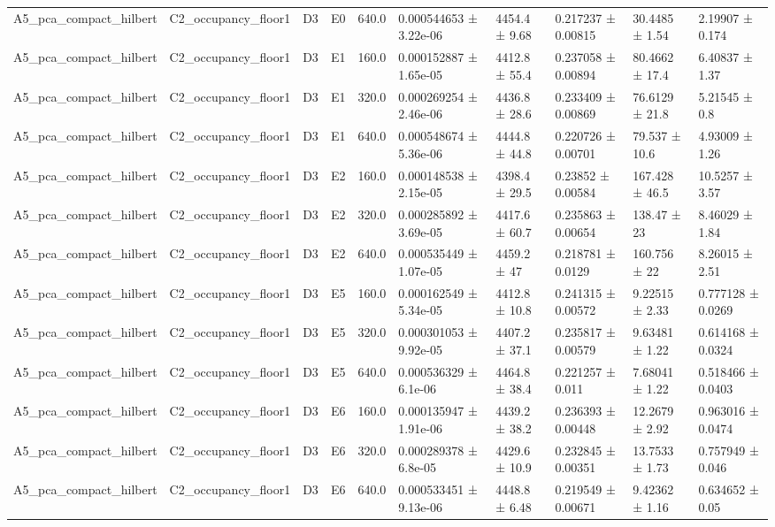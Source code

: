\begin{table}
\begin{tabular}{llllllllll}
A5\_pca\_compact\_hilbert & C2\_occupancy\_floor1 & D3 & E0 & 640.0 & 0.000544653 ± 3.22e-06 & 4454.4 ± 9.68 & 0.217237 ± 0.00815 & 30.4485 ± 1.54 & 2.19907 ± 0.174 \\
A5\_pca\_compact\_hilbert & C2\_occupancy\_floor1 & D3 & E1 & 160.0 & 0.000152887 ± 1.65e-05 & 4412.8 ± 55.4 & 0.237058 ± 0.00894 & 80.4662 ± 17.4 & 6.40837 ± 1.37 \\
A5\_pca\_compact\_hilbert & C2\_occupancy\_floor1 & D3 & E1 & 320.0 & 0.000269254 ± 2.46e-06 & 4436.8 ± 28.6 & 0.233409 ± 0.00869 & 76.6129 ± 21.8 & 5.21545 ± 0.8 \\
A5\_pca\_compact\_hilbert & C2\_occupancy\_floor1 & D3 & E1 & 640.0 & 0.000548674 ± 5.36e-06 & 4444.8 ± 44.8 & 0.220726 ± 0.00701 & 79.537 ± 10.6 & 4.93009 ± 1.26 \\
A5\_pca\_compact\_hilbert & C2\_occupancy\_floor1 & D3 & E2 & 160.0 & 0.000148538 ± 2.15e-05 & 4398.4 ± 29.5 & 0.23852 ± 0.00584 & 167.428 ± 46.5 & 10.5257 ± 3.57 \\
A5\_pca\_compact\_hilbert & C2\_occupancy\_floor1 & D3 & E2 & 320.0 & 0.000285892 ± 3.69e-05 & 4417.6 ± 60.7 & 0.235863 ± 0.00654 & 138.47 ± 23 & 8.46029 ± 1.84 \\
A5\_pca\_compact\_hilbert & C2\_occupancy\_floor1 & D3 & E2 & 640.0 & 0.000535449 ± 1.07e-05 & 4459.2 ± 47 & 0.218781 ± 0.0129 & 160.756 ± 22 & 8.26015 ± 2.51 \\
A5\_pca\_compact\_hilbert & C2\_occupancy\_floor1 & D3 & E5 & 160.0 & 0.000162549 ± 5.34e-05 & 4412.8 ± 10.8 & 0.241315 ± 0.00572 & 9.22515 ± 2.33 & 0.777128 ± 0.0269 \\
A5\_pca\_compact\_hilbert & C2\_occupancy\_floor1 & D3 & E5 & 320.0 & 0.000301053 ± 9.92e-05 & 4407.2 ± 37.1 & 0.235817 ± 0.00579 & 9.63481 ± 1.22 & 0.614168 ± 0.0324 \\
A5\_pca\_compact\_hilbert & C2\_occupancy\_floor1 & D3 & E5 & 640.0 & 0.000536329 ± 6.1e-06 & 4464.8 ± 38.4 & 0.221257 ± 0.011 & 7.68041 ± 1.22 & 0.518466 ± 0.0403 \\
A5\_pca\_compact\_hilbert & C2\_occupancy\_floor1 & D3 & E6 & 160.0 & 0.000135947 ± 1.91e-06 & 4439.2 ± 38.2 & 0.236393 ± 0.00448 & 12.2679 ± 2.92 & 0.963016 ± 0.0474 \\
A5\_pca\_compact\_hilbert & C2\_occupancy\_floor1 & D3 & E6 & 320.0 & 0.000289378 ± 6.8e-05 & 4429.6 ± 10.9 & 0.232845 ± 0.00351 & 13.7533 ± 1.73 & 0.757949 ± 0.046 \\
A5\_pca\_compact\_hilbert & C2\_occupancy\_floor1 & D3 & E6 & 640.0 & 0.000533451 ± 9.13e-06 & 4448.8 ± 6.48 & 0.219549 ± 0.00671 & 9.42362 ± 1.16 & 0.634652 ± 0.05 \\

\end{tabular}
\end{table}
